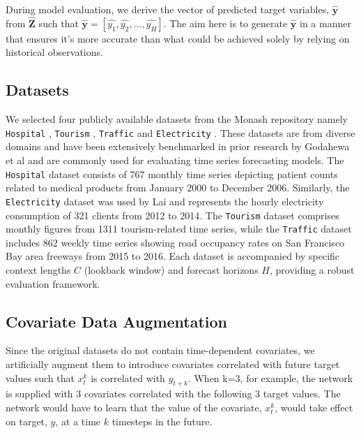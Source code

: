 \documentclass[letterpaper]{article}
\newcommand{\horizon}{H}
\newcommand{\contextlength}{C}
\newcommand{\prediction}{\hat{\mathbf{Z}}}
\begin{document}
During model evaluation, we derive the vector of predicted target variables, $\mathbf{\hat{y}}$ from $\prediction$ such that $\mathbf{\hat{y}} = [\hat{y_1}, \hat{y_2}, \dots, \hat{y_\horizon}]$.
The aim here is to generate $\mathbf{\hat{y}}$ in a manner that ensures it's more accurate than what could be achieved solely by relying on historical observations.

\subsection{Datasets}
We selected four publicly available datasets from the Monash repository \cite{DBLP:conf/nips/GodahewaBWHM21} 
namely \texttt{Hospital} \cite{godahewa_2021_4656014}, \texttt{Tourism} \cite{godahewa_2021_4656096}, \texttt{Traffic} \cite{godahewa_2021_4656135} 
and \texttt{Electricity} \cite{godahewa_2021_4656140}. These datasets are from diverse domains and have 
been extensively benchmarked in prior research by Godahewa et al \cite{DBLP:conf/nips/GodahewaBWHM21} and are commonly used for evaluating time series 
forecasting models. The \texttt{Hospital} dataset consists of 767 monthly time series depicting patient counts related to 
medical products from January 2000 to December 2006. 
Similarly, the \texttt{Electricity} dataset was used by Lai \cite{lai2018modeling} and represents the hourly electricity 
consumption of 321 clients from 2012 to 2014. The \texttt{Tourism} dataset comprises monthly figures from 1311 tourism-related time series, 
while the \texttt{Traffic} dataset includes 862 weekly time series showing road occupancy rates on San 
Francisco Bay area freeways from 2015 to 2016. Each dataset is accompanied by specific context 
lengths $\contextlength$ (lookback window) and forecast horizons $\horizon$, providing a robust evaluation framework.

\subsection{Covariate Data Augmentation}
Since the original datasets do not contain time-dependent covariates, we artificially augment them 
to introduce covariates correlated with future target values such that $x_t^k$ is correlated with $y_{t+k}$.
When k=3, for example, the network is supplied with 3 covariates correlated with the following 3 target values. 
The network would have to learn that the value of the covariate, $x_t^k$, would take effect on target, $y$, at a time $k$ timesteps in the future. 
\end{document}
